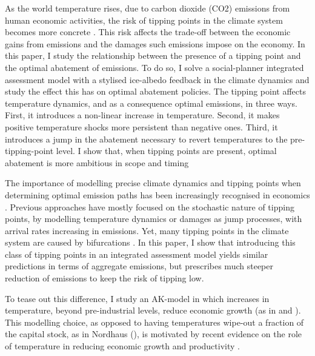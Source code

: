 \documentclass[../../main.tex]{subfiles}
\begin{document}
As the world temperature rises, due to carbon dioxide (CO2) emissions from human economic activities, the risk of tipping points in the climate system becomes more concrete \citep{ashwin_extreme_2020,sledd_cloudier_2021}. This risk affects the trade-off between the economic gains from emissions and the damages such emissions impose on the economy. In this paper, I study the relationship between the presence of a tipping point and the optimal abatement of emissions. To do so, I solve a social-planner integrated assessment model with a stylised ice-albedo feedback in the climate dynamics \citep{hogg_glacial_2008,ashwin_tipping_2012} and study the effect this has on optimal abatement policies. The tipping point affects temperature dynamics, and as a consequence optimal emissions, in three ways. First, it introduces a non-linear increase in temperature. Second, it makes positive temperature shocks more persistent than negative ones. Third, it introduces a jump in the abatement necessary to revert temperatures to the pre-tipping-point level. I show that, when tipping points are present, optimal abatement is more ambitious in scope and timing

The importance of modelling precise climate dynamics and tipping points when determining optimal emission paths has been increasingly recognised in economics \citep{van_den_bremer_risk-adjusted_2021,dietz_economic_2021,dietz_are_2020,taconet_social_2021,lontzek_stochastic_2015}. Previous approaches have mostly focused on the stochastic nature of tipping points, by modelling temperature dynamics \citep{dietz_economic_2021} or damages \citep{lontzek_stochastic_2015} as jump processes, with arrival rates increasing in emissions. Yet, many tipping points in the climate system are caused by bifurcations \citep{ashwin_extreme_2020,ashwin_tipping_2012}. In this paper, I show that introducing this class of tipping points in an integrated assessment model yields similar predictions in terms of aggregate emissions, but prescribes much steeper reduction of emissions to keep the risk of tipping low.

To tease out this difference, I study an AK-model in which increases in temperature, beyond pre-industrial levels, reduce economic growth (as in \cite{pindyck_economic_2013} and \cite{hambel_optimal_2021}). This modelling choice, as opposed to having temperatures wipe-out a fraction of the capital stock, as in Nordhaus (\citeyear{nordhaus_estimates_2014,nordhaus_question_2008,nordhaus_revisiting_2017}), is motivated by recent evidence on the role of temperature in reducing economic growth and productivity \citep{burke_global_2015, dietz_growth_2019}.
\end{document}
